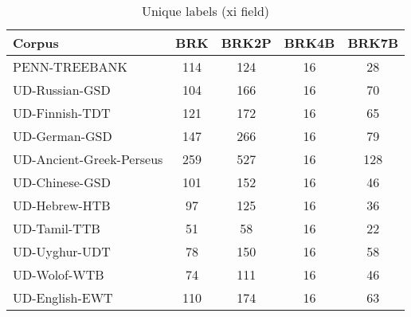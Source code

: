         \begin{table}[h]
            \centering
            \caption{Unique labels (xi field)}
            \label{tab:unique}
            \begin{tabular}{lcccc}
                \hline
                Corpus                      & BRK & BRK2P & BRK4B & BRK7B \\
                \hline
                PENN-TREEBANK               & 114 &   124 &    16 &    28 \\
                UD-Russian-GSD              & 104 &   166 &    16 &    70 \\
                UD-Finnish-TDT              & 121 &   172 &    16 &    65 \\
                UD-German-GSD               & 147 &   266 &    16 &    79 \\
                UD-Ancient-Greek-Perseus    & 259 &   527 &    16 &   128 \\
                UD-Chinese-GSD              & 101 &   152 &    16 &    46 \\
                UD-Hebrew-HTB               &  97 &   125 &    16 &    36 \\
                UD-Tamil-TTB                &  51 &    58 &    16 &    22 \\
                UD-Uyghur-UDT               &  78 &   150 &    16 &    58 \\
                UD-Wolof-WTB                &  74 &   111 &    16 &    46 \\
                UD-English-EWT              & 110 &   174 &    16 &    63 \\
                \hline
            \end{tabular}
        \end{table}



